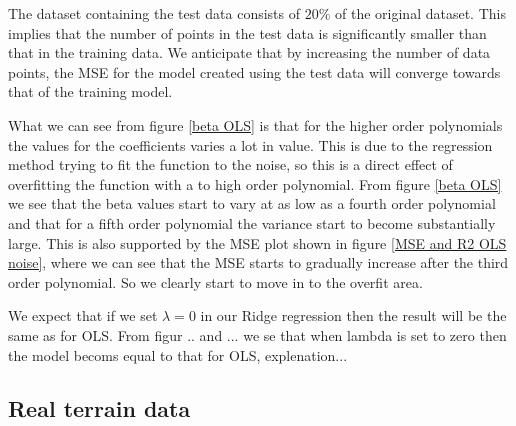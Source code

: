 The dataset containing the test data consists of $20\%$ of the original
dataset. This implies that the number of points in the test data is 
significantly smaller than that in the training data. We anticipate 
that by increasing the number of data points, the MSE for the model 
created using the test data will converge towards that of the training
model.

What we can see from figure \eqref{beta OLS} is that for the higher order 
polynomials the values for the coefficients varies a lot in value. This is due to 
the regression method trying to fit the function to the noise, so this is a direct 
effect of overfitting the function with a to high order polynomial. From figure \eqref{beta OLS}
we see that the beta values start to vary at as low as a fourth order polynomial and that 
for a fifth order polynomial the variance start to become substantially large. This is 
also supported by the MSE plot shown in figure \eqref{MSE and R2 OLS noise}, where we can
see that the MSE starts to gradually increase after the third order polynomial. So we clearly
start to move in to the overfit area. 

We expect that if we set $\lambda = 0$ in our Ridge regression then the result 
will be the same as for OLS. From figur .. and ... we se that when lambda is 
set to zero then the model becoms equal to that for OLS, explenation...


\subsection*{Real terrain data}